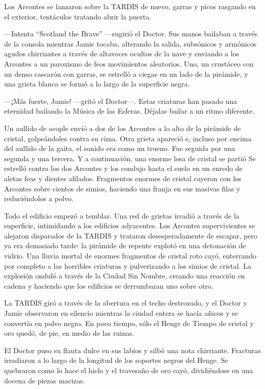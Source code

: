 Los Arcontes se lanzaron sobre la TARDIS de nuevo, garras y picos
rasgando en el exterior, tentáculos tratando abrir la puerta.

---Intenta ``Scotland the Brave'' ---sugirió el Doctor. Sus manos
bailaban a través de la consola mientras Jamie tocaba, alterando la
salida, subsónicos y armónicos agudos chirriantes a través de altavoces
ocultos de la nave y enviando a los Arcontes a un paroxismo de feos
movimientos aleatorios. Uno, un crustáceo con un denso cascarón con
garras, se estrelló a ciegas en un lado de la pirámide, y una grieta
blanca se formó a lo largo de la superficie negra.

---¡Más fuerte, Jamie! ---gritó el Doctor---. Estas criaturas han pasado
una eternidad bailando la Música de las Esferas. Déjalas bailar a un
ritmo diferente.

Un aullido de acople envió a dos de los Arcontes a lo alto de la
pirámide de cristal, golpeándoles contra su cima. Otra grieta apareció
e, incluso por encima del aullido de la gaita, el sonido era como un
trueno. Fue seguida por una segunda y una tercera. Y a continuación, una
enorme losa de cristal se partió Se estrelló contra los dos Arcontes y
los condujo hasta el suelo en un enredo de aletas feas y dientes
afilados. Fragmentos enormes de cristal cayeron con los Arcontes sobre
cientos de simios, haciendo una franja en sus masivas filas y
reduciéndolos a polvo.

Todo el edificio empezó a temblar. Una red de grietas irradió a través
de la superficie, intimidando a los edificios adyacentes. Los Arcontes
supervivientes se alejaron disparados de la TARDIS y trataron
desesperadamente de escapar, pero ya era demasiado tarde: la pirámide de
repente explotó en una detonación de vidrio. Una lluvia mortal de
enormes fragmentos de cristal roto cayó, enterrando por completo a las
horribles criaturas y pulverizando a los simios de cristal. La explosión
onduló a través de la Ciudad Sin Nombre, creando una reacción en cadena
y haciendo que  los edificios se derrumbaran uno sobre otro.

La TARDIS giró a través de la abertura en el techo destrozado, y el
Doctor y Jamie observaron en silencio mientras la ciudad entera se hacía
añicos y se convertía en polvo negro. En poco tiempo, sólo el Henge de
Tiempo de cristal y oro quedó, de pie, en medio de las ruinas.

El Doctor puso su flauta dulce en sus labios y silbó una nota
chirriante. Fracturas irradiaron a lo largo de la longitud de los
soportes negros del Henge. Se quebraron como lo hace el hielo y el
travesaño de oro cayó, dividiéndose en una docena de piezas macizas.

